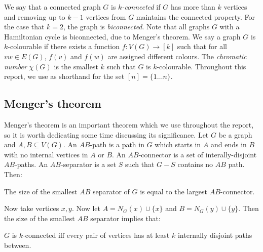 We say that a connected graph \(G\) is \textit{\(k\)-connected} if \(G\) has more than \(k\) vertices and removing up to \(k-1\) vertices from \(G\) maintains the connected property. For the case that \(k = 2\), the graph is \textit{biconnected}. Note that all graphs \(G\) with a Hamiltonian cycle is biconnected, due to Menger's theorem.\cite{mengerZurAllgemeinenKurventheorie1927}
We say a graph \(G\) is \(k\)-colourable if there exists a function \(f: V(G) \rightarrow [k]\) such that for all \(vw \in E(G)\), \(f(v)\) and \(f(w)\) are assigned different colours. The \textit{chromatic number} \(\chi(G)\) is the smallest \(k\) such that \(G\) is \(k\)-colourable.
Throughout this report, we use as shorthand for the set \( [n] = \lbrace 1\ldots n \rbrace \).

\subsection{Menger's theorem}
Menger's theorem \cite{mengerZurAllgemeinenKurventheorie1927} is an important theorem which we use throughout the report, so it is worth dedicating some time discussing its significance.
Let \(G\) be a graph and \(A, B \subseteq V(G)\). An \(AB\)-path is a path in \(G\) which starts in \(A\) and ends in \(B\) with no internal vertices in \(A\) or \(B\). An \(AB\)-connector is a set of interally-disjoint \(AB\)-paths. An \(AB\)-separator is a set \(S\) such that \(G - S\) contains no \(AB\) path. Then:
\begin{theorem}\label{thm:Menger}
	The size of the smallest \(AB\) separator of \(G\) is equal to the largest \(AB\)-connector.
\end{theorem}
Now take vertices \(x, y\). Now let \(A = N_G(x) \cup \{x\} \) and \(B = N_G(y) \cup \{y\} \). Then the size of the smallest \(AB\) separator implies that:
\begin{theorem}\label{thm:Menger_Vertex}
	\(G\) is \(k\)-connected iff every pair of vertices has at least \(k\) internally disjoint paths between.
\end{theorem}

